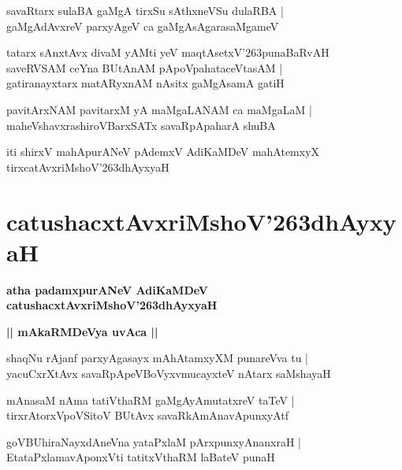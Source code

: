 \documentclass[twoside,12pt,openright]{book}
\def\S{\char'263}
\newcounter{shloka}[chapter]
\def\uvaca#1{\centerline{{\large\textbf{#1}}}}
\begin{document}
\begin{shloka}
savaRtarx sulaBA gaMgA tirxSu sAthxneVSu dulaRBA |\\
gaMgAdAvxreV parxyAgeV ca gaMgAsAgarasaMgameV 
\end{shloka}

\begin{shloka}
tatarx sAnxtAvx divaM yAMti yeV maqtAsetxV\S punaBaRvAH \\
saveRVSAM ceYna BUtAnAM pApoVpahataceVtasAM |\\
gatiranayxtarx matARyxnAM nAsitx gaMgAsamA gatiH 
\end{shloka}

\begin{shloka}
pavitArxNAM pavitarxM yA maMgaLANAM ca maMgaLaM |\\
maheVshavxrashiroVBarxSATx savaRpApaharA shuBA
\end{shloka}

\begin{center}
iti shirxV mahApurANeV pAdemxV AdiKaMDeV mahAtemxyX tirxcatAvxriMshoV\S dhAyxyaH
\end{center}


\chapter{catushacxtAvxriMshoV\S dhAyxyaH}

\begin{center}
{\LARGE\bfseries atha padamxpurANeV AdiKaMDeV catushacxtAvxriMshoV\S dhAyxyaH}
\end{center}

\uvaca{|| mAkaRMDeVya uvAca ||}


\begin{shloka}
shaqNu rAjanf parxyAgasayx mAhAtamxyXM punareVva tu |\\
yacuCxrXtAvx savaRpApeVBoVyxvmucayxteV nAtarx saMshayaH 
\end{shloka}

\begin{shloka}
mAnasaM nAma tatiVthaRM gaMgAyAmutatxreV taTeV |\\
tirxrAtorxVpoVSitoV BUtAvx savaRkAmAnavApunxyAtf 
\end{shloka}

\begin{shloka}
goVBUhiraNayxdAneVna yataPxlaM pArxpunxyAnanxraH |\\
EtataPxlamavAponxVti tatitxVthaRM laBateV punaH 
\end{shloka}
\end{document}
